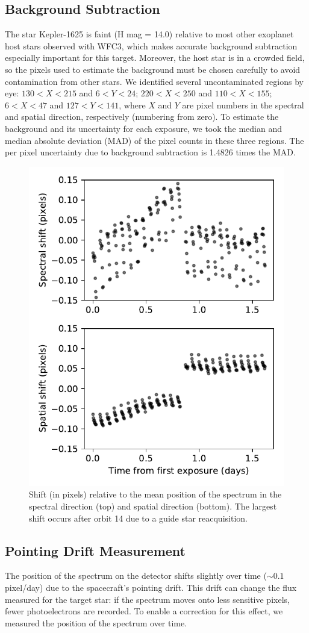 \documentclass[twocolumn]{aastex62}
\begin{document}
\subsection{Background Subtraction} 
\label{sec:background}
The star Kepler-1625 is faint (H mag = 14.0) relative to most other exoplanet host stars observed with WFC3, which makes accurate background subtraction especially important for this target. Moreover, the host star is in a crowded field, so the pixels used to estimate the background must be chosen carefully to avoid contamination from other stars.  We identified several uncontaminated regions by eye: $130 < X < 215$ and $6 < Y  < 24$;  $220 < X < 250$ and $110 < X < 155$; $6 < X < 47$ and $127 < Y < 141$, where $X$ and $Y$ are pixel numbers in the spectral and spatial direction, respectively (numbering from zero).  To estimate the background and its uncertainty for each exposure, we took the median and median absolute deviation (MAD) of the pixel counts in these three regions. The per pixel uncertainty due to background subtraction is 1.4826 times the MAD.

\begin{figure}
\includegraphics[width = 0.5 \textwidth]{figures/fig4_shifts.pdf}
    \caption{Shift (in pixels) relative to the mean position of the spectrum in the spectral direction (top) and spatial direction (bottom). The largest shift occurs after orbit 14 due to a guide star reacquisition.}
\label{fig:shifts}
\end{figure}

\subsection{Pointing Drift Measurement}
The position of the spectrum on the detector shifts slightly over time ($\sim0.1$ pixel/day) due to the spacecraft's pointing drift. This drift can change the flux measured for the target star: if the spectrum moves onto less sensitive pixels, fewer photoelectrons are recorded. To enable a correction for this effect, we measured the position of the spectrum over time.  
\end{document}
